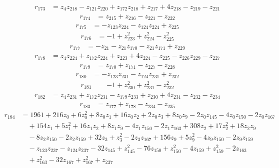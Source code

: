 \begin{align*}
r_{173} &=z_{4}z_{218}-z_{121}z_{220}+z_{172}z_{218}+z_{217}+4z_{218}-z_{219}-z_{221}
\end{align*}
\begin{align*}
r_{174} &=z_{215}+z_{216}-z_{221}-z_{222}
\end{align*}
\begin{align*}
r_{175} &=-z_{123}z_{224}-z_{124}z_{224}+z_{225}
\end{align*}
\begin{align*}
r_{176} &=-1+z_{223}^{2}+z_{224}^{2}-z_{225}^{2}
\end{align*}
\begin{align*}
r_{177} &=-z_{21}-z_{21}z_{170}-z_{21}z_{171}+z_{229}
\end{align*}
\begin{align*}
r_{178} &=z_{4}z_{224}+z_{172}z_{224}+z_{223}+4z_{224}-z_{225}-z_{226}z_{229}-z_{227}
\end{align*}
\begin{align*}
r_{179} &=z_{170}+z_{171}-z_{227}-z_{228}
\end{align*}
\begin{align*}
r_{180} &=-z_{123}z_{231}-z_{124}z_{231}+z_{232}
\end{align*}
\begin{align*}
r_{181} &=-1+z_{230}^{2}+z_{231}^{2}-z_{232}^{2}
\end{align*}
\begin{align*}
r_{182} &=z_{4}z_{231}+z_{172}z_{231}-z_{179}z_{233}+z_{230}+4z_{231}-z_{232}-z_{234}
\end{align*}
\begin{align*}
r_{183} &=z_{177}+z_{178}-z_{234}-z_{235}
\end{align*}
\begin{align*}
r_{184} &=1961+216z_{0}+6z_{0}^{2}+8z_{0}z_{1}+16z_{0}z_{2}+2z_{0}z_{3}+8z_{0}z_{9}-2z_{0}z_{145}-4z_{0}z_{150}-2z_{0}z_{167}\\
&\quad +154z_{1}+5z_{1}^{2}+16z_{1}z_{2}+8z_{1}z_{9}-4z_{1}z_{150}-2z_{1}z_{163}+308z_{2}+17z_{2}^{2}+18z_{2}z_{9}\\
&\quad -8z_{2}z_{150}-2z_{2}z_{159}+32z_{3}+z_{3}^{2}-2z_{3}z_{167}+156z_{9}+5z_{9}^{2}-4z_{9}z_{150}-2z_{9}z_{159}\\
&\quad -z_{123}z_{237}-z_{124}z_{237}-32z_{145}+z_{145}^{2}-76z_{150}+z_{150}^{2}-4z_{159}+z_{159}^{2}-2z_{163}\\
&\quad +z_{163}^{2}-32z_{167}+z_{167}^{2}+z_{237}
\end{align*}
